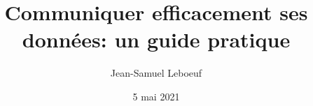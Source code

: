 \documentclass[aspectratio=169]{beamer}
\title{Communiquer efficacement ses données: un guide pratique}
\author[J.S. Leboeuf]{Jean-Samuel Leboeuf}
\date{5 mai 2021}
\begin{document}
\begin{frame}
\thispagestyle{empty}
\titlepage
\end{frame}







\end{document}
